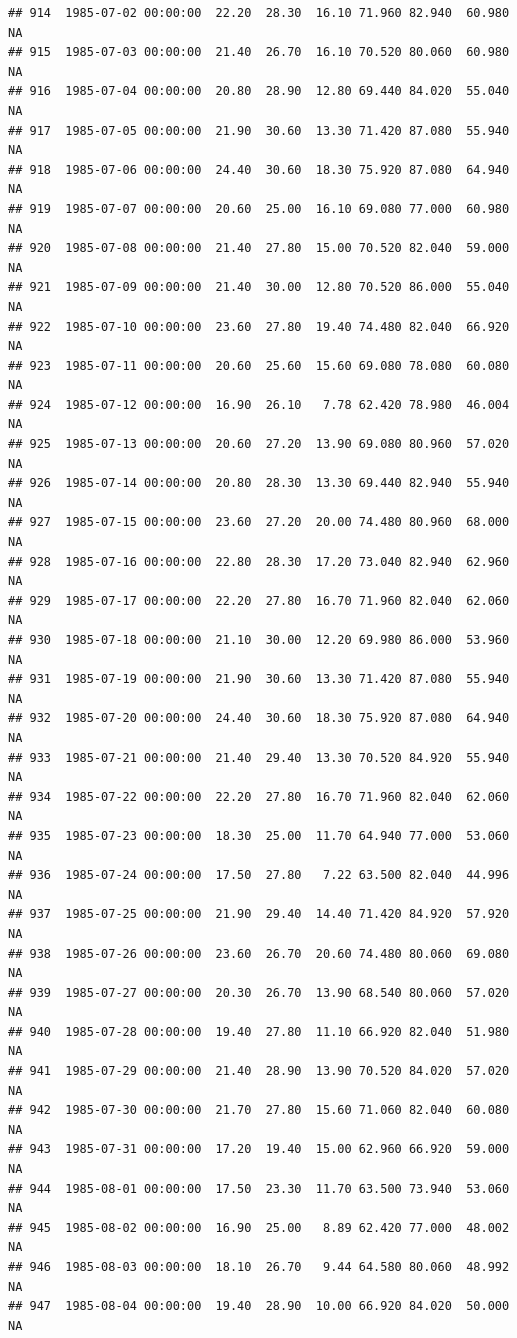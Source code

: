 \documentclass{article}\usepackage{graphicx, color}
\makeatletter
\newenvironment{kframe}{%
 \def\at@end@of@kframe{}%
 \ifinner\ifhmode%
  \def\at@end@of@kframe{\end{minipage}}%
  \begin{minipage}{\columnwidth}%
 \fi\fi%
 \def\FrameCommand##1{\hskip\@totalleftmargin \hskip-\fboxsep
 \colorbox{shadecolor}{##1}\hskip-\fboxsep
     \hskip-\linewidth \hskip-\@totalleftmargin \hskip\columnwidth}%
 \MakeFramed {\advance\hsize-\width
   \@totalleftmargin\z@ \linewidth\hsize
   \@setminipage}}%
 {\par\unskip\endMakeFramed%
 \at@end@of@kframe}
\newenvironment{knitrout}{}{} %
\makeatother
\begin{document}
\begin{knitrout}
\begin{kframe}
\begin{verbatim}
## 914  1985-07-02 00:00:00  22.20  28.30  16.10 71.960 82.940  60.980     NA
## 915  1985-07-03 00:00:00  21.40  26.70  16.10 70.520 80.060  60.980     NA
## 916  1985-07-04 00:00:00  20.80  28.90  12.80 69.440 84.020  55.040     NA
## 917  1985-07-05 00:00:00  21.90  30.60  13.30 71.420 87.080  55.940     NA
## 918  1985-07-06 00:00:00  24.40  30.60  18.30 75.920 87.080  64.940     NA
## 919  1985-07-07 00:00:00  20.60  25.00  16.10 69.080 77.000  60.980     NA
## 920  1985-07-08 00:00:00  21.40  27.80  15.00 70.520 82.040  59.000     NA
## 921  1985-07-09 00:00:00  21.40  30.00  12.80 70.520 86.000  55.040     NA
## 922  1985-07-10 00:00:00  23.60  27.80  19.40 74.480 82.040  66.920     NA
## 923  1985-07-11 00:00:00  20.60  25.60  15.60 69.080 78.080  60.080     NA
## 924  1985-07-12 00:00:00  16.90  26.10   7.78 62.420 78.980  46.004     NA
## 925  1985-07-13 00:00:00  20.60  27.20  13.90 69.080 80.960  57.020     NA
## 926  1985-07-14 00:00:00  20.80  28.30  13.30 69.440 82.940  55.940     NA
## 927  1985-07-15 00:00:00  23.60  27.20  20.00 74.480 80.960  68.000     NA
## 928  1985-07-16 00:00:00  22.80  28.30  17.20 73.040 82.940  62.960     NA
## 929  1985-07-17 00:00:00  22.20  27.80  16.70 71.960 82.040  62.060     NA
## 930  1985-07-18 00:00:00  21.10  30.00  12.20 69.980 86.000  53.960     NA
## 931  1985-07-19 00:00:00  21.90  30.60  13.30 71.420 87.080  55.940     NA
## 932  1985-07-20 00:00:00  24.40  30.60  18.30 75.920 87.080  64.940     NA
## 933  1985-07-21 00:00:00  21.40  29.40  13.30 70.520 84.920  55.940     NA
## 934  1985-07-22 00:00:00  22.20  27.80  16.70 71.960 82.040  62.060     NA
## 935  1985-07-23 00:00:00  18.30  25.00  11.70 64.940 77.000  53.060     NA
## 936  1985-07-24 00:00:00  17.50  27.80   7.22 63.500 82.040  44.996     NA
## 937  1985-07-25 00:00:00  21.90  29.40  14.40 71.420 84.920  57.920     NA
## 938  1985-07-26 00:00:00  23.60  26.70  20.60 74.480 80.060  69.080     NA
## 939  1985-07-27 00:00:00  20.30  26.70  13.90 68.540 80.060  57.020     NA
## 940  1985-07-28 00:00:00  19.40  27.80  11.10 66.920 82.040  51.980     NA
## 941  1985-07-29 00:00:00  21.40  28.90  13.90 70.520 84.020  57.020     NA
## 942  1985-07-30 00:00:00  21.70  27.80  15.60 71.060 82.040  60.080     NA
## 943  1985-07-31 00:00:00  17.20  19.40  15.00 62.960 66.920  59.000     NA
## 944  1985-08-01 00:00:00  17.50  23.30  11.70 63.500 73.940  53.060     NA
## 945  1985-08-02 00:00:00  16.90  25.00   8.89 62.420 77.000  48.002     NA
## 946  1985-08-03 00:00:00  18.10  26.70   9.44 64.580 80.060  48.992     NA
## 947  1985-08-04 00:00:00  19.40  28.90  10.00 66.920 84.020  50.000     NA

\end{verbatim}
\end{kframe}
\end{knitrout}
\end{document}
